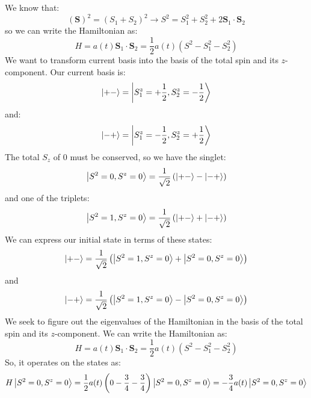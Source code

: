 \documentclass[12pt]{article}
\begin{document}
\subsection{}
We know that:
\begin{equation}
  (\mathbf{S})^2 = (S_1 + S_2)^2 \rightarrow S^2 = S_1^2 + S_2^2 + 2\mathbf{S}_1 \cdot \mathbf{S}_2
\end{equation}
so we can write the Hamiltonian as:
\begin{equation}
  H = a(t) \mathbf{S}_1 \cdot \mathbf{S}_2 = \frac{1}{2}a(t) \left(S^2 - S_1^2 - S_2^2\right) 
\end{equation}
We want to transform current basis into the basis of the total spin and its $z$-component. Our current basis is:
\begin{equation}
  \ket{+-} = \ket{S_1^z = +\frac{1}{2}, S_2^z = -\frac{1}{2}}
\end{equation}
and:
\begin{equation}
  \ket{-+} = \ket{S_1^z = -\frac{1}{2}, S_2^z = +\frac{1}{2}}
\end{equation}
The total $S_z$ of 0 must be conserved, so we have the singlet:
\begin{equation}
  \ket{S^2 = 0, S^z = 0} = \frac{1}{\sqrt{2}}\left(\ket{+-} - \ket{-+}\right)
\end{equation}
and one of the triplets:
\begin{equation}
  \ket{S^2 = 1, S^z = 0} = \frac{1}{\sqrt{2}}\left(\ket{+-} + \ket{-+}\right)
\end{equation}
We can express our initial state in terms of these states:
\begin{equation}
  \ket{+-} = \frac{1}{\sqrt{2}}\left(\ket{S^2 = 1, S^z = 0} + \ket{S^2 = 0, S^z = 0}\right)
\end{equation}
and
\begin{equation}
  \ket{-+} = \frac{1}{\sqrt{2}}\left(\ket{S^2 = 1, S^z = 0} - \ket{S^2 = 0, S^z = 0}\right)
\end{equation}
We seek to figure out the eigenvalues of the Hamiltonian in the basis of the total spin and its $z$-component. We can write the Hamiltonian as:
\begin{equation}
  H = a(t) \mathbf{S}_1 \cdot \mathbf{S}_2 = \frac{1}{2}a(t) \left(S^2 - S_1^2 - S_2^2\right)
\end{equation}
So, it operates on the states as:
\begin{equation}
  H\ket{S^2 = 0, S^z = 0} = \frac{1}{2}a(t)\left(0 - \frac{3}{4} - \frac{3}{4}\right)\ket{S^2 = 0, S^z = 0} = -\frac{3}{4}a(t)\ket{S^2 = 0, S^z = 0}
\end{equation}
\end{document}
